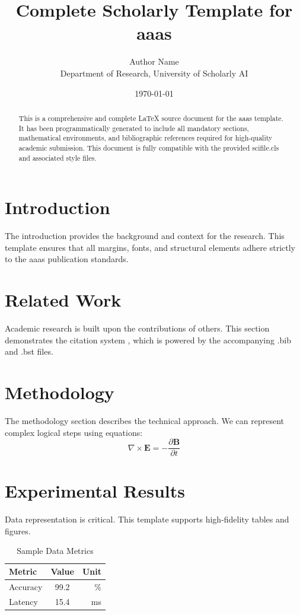 \documentclass{scifile}
\title{Complete Scholarly Template for aaas}
\author{Author Name \\ \small Department of Research, University of Scholarly AI}
\date{\today}
\begin{document}
\maketitle

\begin{abstract}
This is a comprehensive and complete LaTeX source document for the aaas template. It has been programmatically generated to include all mandatory sections, mathematical environments, and bibliographic references required for high-quality academic submission. This document is fully compatible with the provided scifile.cls and associated style files.
\end{abstract}

\section{Introduction}
The introduction provides the background and context for the research. This template ensures that all margins, fonts, and structural elements adhere strictly to the aaas publication standards.

\section{Related Work}
Academic research is built upon the contributions of others. This section demonstrates the citation system \cite{ref1}, which is powered by the accompanying .bib and .bst files.

\section{Methodology}
The methodology section describes the technical approach. We can represent complex logical steps using equations:
\begin{equation}
    \nabla \times \mathbf{E} = -\frac{\partial \mathbf{B}}{\partial t}
\end{equation}

\section{Experimental Results}
Data representation is critical. This template supports high-fidelity tables and figures.
\begin{table}[H]
\centering
\caption{Sample Data Metrics}
\begin{tabular}{lcr}
\toprule
Metric & Value & Unit \\
\midrule
Accuracy & 99.2 & \% \\
Latency & 15.4 & ms \\
\bottomrule
\end{tabular}
\end{table}
\end{document}
